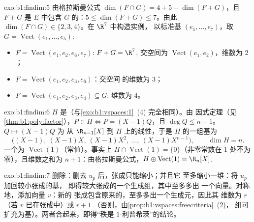 \begin{solution}{exo:b1:findim:5}
由格拉斯曼公式 $\dim(F \cap G) = 4 + 5 - \dim(F + G)$，且 $F + G$ 是
$E$ 中包含 $G$ 的：$5 \leq \dim(F+G) \leq 7$。由此
$\dim(F \cap G) \in \{2, 3, 4\}$。在 $\R^7$ 中构造实例，
以标准基 $(e_1, \dots, e_7)$，取 $G =
\operatorname{Vect}(e_1, \dots, e_5)$:
\begin{itemize}
  \item $F = \operatorname{Vect}(e_1, e_2, e_6, e_7)$: $F + G = \R^7$,
        交空间为 $\operatorname{Vect}(e_1, e_2)$，维数为 $2$；
  \item $F = \operatorname{Vect}(e_1, e_2, e_3, e_6)$：交空间
        的维数为 $3$；
  \item $F = \operatorname{Vect}(e_1, e_2, e_3, e_4) \subseteq G$:
        维数为 $4$。
\end{itemize}
\end{solution}

\begin{solution}{exo:b1:findim:6}
$H$ 是（与\cref{exo:b1:vspaces:1}~(4) 完全相同）。由
因式定理（见\cref{thm:b1:poly:factor}），$P \in H \iff P =
(X-1)Q$，且 $\deg Q \leq n - 1$。 $Q \mapsto (X-1)Q$ 为
从 $\R_{n-1}[X]$ 到 $H$ 上的线性，于是 $H$ 的一组基为
\[
\bigl((X-1),\ (X-1)X,\ (X-1)X^2,\ \dots,\ (X-1)X^{n-1}\bigr),
\qquad \dim H = n .
\]
一个为 $\operatorname{Vect}(1)$（常值）。事实上
$H \cap \operatorname{Vect}(1) = \{0\}$（非零常数在
$1$ 处不为零），且维数之和为 $n + 1$：由格拉斯曼公式，$H
\oplus \operatorname{Vect}(1) = \R_n[X]$.
\end{solution}

\begin{solution}{exo:b1:findim:7}
删除：删去 $u_p$ 后，张成只能缩小；并且它
至多缩小一维：将 $u_p$ 加回较小张成的基，
即得较大张成的一个生成组，其中至多多出
一个向量。对称地，添加向量 $v$：新的
张成包含原来的，至多多出一个生成元，因此其
维数为 $r$（若 $v$ 已在张成中）或 $r + 1$
（否则，由\cref{prop:b1:vspaces:freecriteria}~(2)，
组可扩充为基）。两者合起来，即得“秩是
$1$-利普希茨”的结论。
\end{solution}

